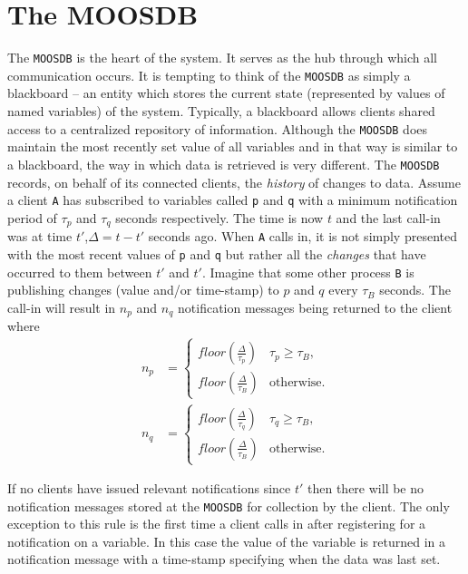 \documentclass[a4paper,10pt]{article}
\newcommand{\Code}[1]{\texttt{#1} }
\newcommand{\code}[1]{\Code{#1} }
\newcommand{\DB}   {\code{{MOOSDB}}}
\begin{document}
\section{The MOOSDB}\label{sec:DB}
The \DB is the heart of the system. It serves as the hub through
which all communication occurs. It is tempting to think of the \DB
as simply a blackboard -- an entity which stores the current state
(represented by values of named variables) of the system.
Typically, a blackboard allows clients shared access to a
centralized repository of information. Although the \DB does
maintain the most recently set value of all variables and in that
way is similar to a blackboard, the way in which data is retrieved
is very different. The \DB records, on  behalf of its connected
clients, the {\it{history}} of changes to data. Assume a client
\code{A} has subscribed to variables called \code{p} and \code{q}
with a minimum notification period of $\tau_{p}$ and  $\tau_{q}$
seconds respectively. The time is now $t$ and the last call-in was
at time $t'$,$\Delta = t-t'$ seconds ago. When \code{A} calls in,
it is not simply presented with the most recent values of \code{p}
and \code{q} but rather all the {\it{changes}} that have occurred
to them between $t'$ and $t'$. Imagine that some other process
\code{B} is publishing changes (value and/or time-stamp) to $p$
and $q$ every $\tau_B$ seconds. The call-in will result in $n_p$
and $n_q$ notification messages being returned to the client where
\begin{align*}
n_p &= \begin{cases}
    floor(\frac{\Delta}{\tau_{p}}) & \text{$\tau_{p} \geq \tau_B$}, \\
    floor(\frac{\Delta}{\tau_{B}}) & \text{otherwise}.
  \end{cases}\\
n_q &= \begin{cases}
    floor(\frac{\Delta}{\tau_{q}}) & \text{$\tau_{q} \geq \tau_B$}, \\
    floor(\frac{\Delta}{\tau_{B}}) & \text{otherwise}.
  \end{cases}
\end{align*}

If no clients have issued relevant notifications since $t'$ then
there will be no notification messages stored at the \DB for
collection by the client. The only exception to this rule is the
first time a client calls in after registering for a notification
on a variable. In this case the value of the variable is returned
in a notification message with a time-stamp specifying when the
data was last set.
\end{document}
